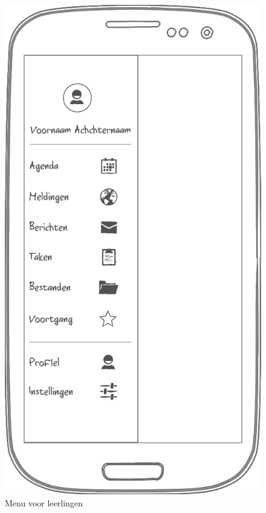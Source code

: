 \documentclass[a4paper]{article}
\begin{document}
\begin{appendices}
\begin{figure}[H]
  \centerline{\includegraphics[width=\textwidth*4/5]{mobiel_leerling}}
  \caption{Menu voor leerlingen}
  \label{fig:mobiel_leerling}
\end{figure}


\end{appendices}
\end{document}
